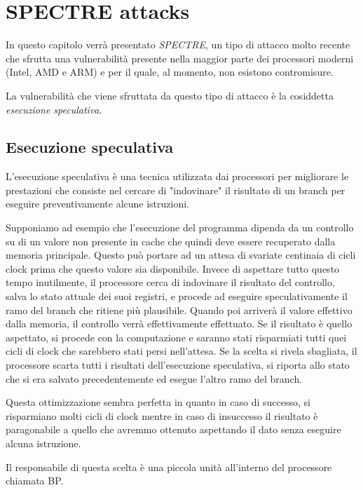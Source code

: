 \chapter{SPECTRE attacks}
	In questo capitolo verrà presentato \emph{SPECTRE}\cite{kocher2018spectre}, un tipo di attacco molto recente che sfrutta una vulnerabilità presente nella maggior parte dei processori moderni (Intel, AMD e ARM) e per il quale, al momento, non esistono contromisure.
	
	La vulnerabilità che viene sfruttata da questo tipo di attacco è la cosiddetta \emph{esecuzione speculativa}.
	
	\section{Esecuzione speculativa}
		L'esecuzione speculativa è una tecnica utilizzata dai processori per migliorare le prestazioni che consiste nel cercare di "indovinare" il risultato di un branch per eseguire preventivamente alcune istruzioni.
		
		Supponiamo ad esempio che l'esecuzione del programma dipenda da un controllo su di un valore non presente in cache che quindi deve essere recuperato dalla memoria principale. Questo può portare ad un attesa di svariate centinaia di cicli clock prima che questo valore sia disponibile. Invece di aspettare tutto questo tempo inutilmente, il processore cerca di indovinare il risultato del controllo, salva lo stato attuale dei suoi registri, e procede ad eseguire speculativamente il ramo del branch che ritiene più plausibile. Quando poi arriverà il valore effettivo dalla memoria, il controllo verrà effettivamente effettuato. Se il risultato è quello aspettato, si procede con la computazione e saranno stati risparmiati tutti quei cicli di clock che sarebbero stati persi nell'attesa. Se la scelta si rivela sbagliata, il processore scarta tutti i risultati dell'esecuzione speculativa, si riporta allo stato che si era salvato precedentemente ed esegue l'altro ramo del branch.
		
		Questa ottimizzazione sembra perfetta in quanto in caso di successo, si risparmiano molti cicli di clock mentre in caso di insuccesso il risultato è paragonabile a quello che avremmo ottenuto aspettando il dato senza eseguire alcuna istruzione.
		
		Il responsabile di questa scelta è una piccola unità all'interno del processore chiamata \ac{BP}.
		
